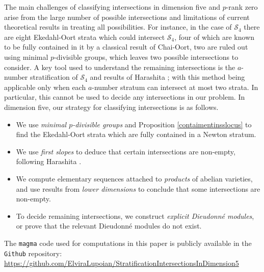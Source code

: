 \documentclass[11pt,table]{amsart}
\numberwithin{equation}{section}
\theoremstyle{definition}
\theoremstyle{remark}
\theoremstyle{remark}
\begin{document}
The main challenges of classifying intersections in dimension five and $p$-rank zero arise from the large number of possible intersections and limitations of current theoretical results in treating all possibilities. For instance, in the case of $\mathcal{S}_4$ there are eight Ekedahl-Oort strata which could intersect $\mathcal{S}_4$,  four of which are known to be fully contained in it by a classical result of Chai-Oort, two are ruled out using minimal $p$-divisible groups, which leaves two possible intersections to consider. A  key tool used to understand the remaining intersections is the $a$-number stratification of $\mathcal{S}_4$ and results of Harashita \cite{harashita2004number}; with this method being applicable only when each $a$-number stratum can intersect at most two strata. In particular, this cannot be used to decide any intersections in our problem. In dimension five, our strategy for classifying intersections is as follows.
\begin{itemize}
\item[1.] We use \textit{minimal $p$-divisible groups} and Proposition \ref{contaimentinsslocus} to find the Ekedahl-Oort strata which are fully contained in a Newton stratum.
\item[2.] We use \textit{first slopes} to deduce that certain intersections are non-empty, following Harashita \cite{harashitaslope}.
\item[3.] We compute elementary sequences attached to \textit{products} of abelian varieties, and use results from \textit{lower dimensions} to conclude that some intersections are non-empty. 
    \item[4.] To decide remaining intersections, we construct \textit{explicit Dieudonn{\'e} modules}, or prove that the relevant Dieudonn{\'e} modules do not exist.  
\end{itemize}
The \texttt{magma} code used for computations in this paper is publicly available in the \texttt{Github} repository:
\url{https://github.com/ElviraLupoian/StratificationIntersectionsInDimension5}
\end{document}

